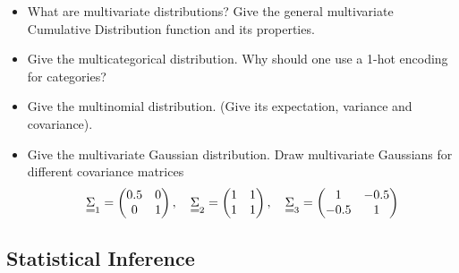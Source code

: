\begin{itemize}
    \item What are multivariate distributions? Give the general multivariate Cumulative Distribution function and its properties.
    \answerboxM
    \item Give the multicategorical distribution. Why should one use a 1-hot encoding for categories?
    \answerboxM
    \item Give the multinomial distribution. (Give its expectation, variance and covariance).
    \answerboxM
    \item Give the multivariate Gaussian distribution. Draw multivariate Gaussians for different covariance matrices
    \begin{equation}
        \mat{\Sigma}_1 = \begin{pmatrix} 0.5 & 0 \\ 0 & 1 \end{pmatrix}, \quad \mat{\Sigma}_2 = \begin{pmatrix} 1 & 1 \\ 1 & 1 \end{pmatrix}, \quad \mat{\Sigma}_3 = \begin{pmatrix} 1 & -0.5 \\ -0.5 & 1 \end{pmatrix}
    \end{equation}
    \answerboxL
\end{itemize}

\subsection*{Statistical Inference}

